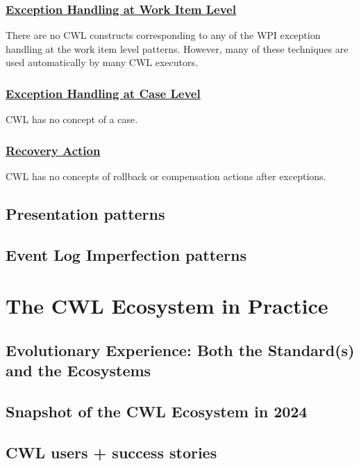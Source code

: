 \subsubsection{\href{http://www.workflowpatterns.com/patterns/exception/exception_workitemlevel.php}{Exception Handling at Work Item Level}}

There are no CWL constructs corresponding to any of the WPI exception handling at the work item level patterns. However, many of these techniques are used automatically by many CWL executors.

\subsubsection{\href{http://www.workflowpatterns.com/patterns/exception/exception_caselevel.php}{Exception Handling at Case Level}}

CWL has no concept of a case.

\subsubsection{\href{http://www.workflowpatterns.com/patterns/exception/recoveryaction.php}{Recovery Action}}

CWL has no concepts of rollback or compensation actions after exceptions.

\subsection{Presentation patterns}
\subsection{Event Log Imperfection patterns}

\section{The CWL Ecosystem in Practice}
\subsection{Evolutionary Experience: Both the Standard(s) and the Ecosystems}
\subsection{Snapshot of the CWL Ecosystem in 2024}
\subsection{CWL users + success stories}

